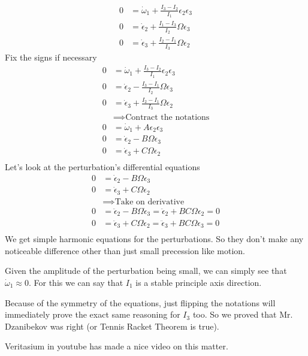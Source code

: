 \documentclass[letter, 10pts]{article}
\begin{document}
\begin{align*}
0 &= \dot{\omega}_1 + \frac{I_3 - I_2}{I_1} \epsilon_2 \epsilon_3 \\
0 &= \dot \epsilon_2 + \frac{I_1 - I_3}{I_2} \Omega \epsilon_3 \\
0 &=  \dot \epsilon_3 + \frac{I_2 - I_1}{I_3} \Omega \epsilon_2
\end{align*}
Fix the signs if necessary 
\begin{align*}
0 &= \dot{\omega}_1 + \frac{I_3 - I_2}{I_1} \epsilon_2 \epsilon_3 \\
0 &= \dot \epsilon_2 - \frac{I_3 - I_1}{I_2} \Omega \epsilon_3 \\
0 &=  \dot \epsilon_3 + \frac{I_2 - I_1}{I_3} \Omega \epsilon_2 \\
  &\implies \text{Contract the notations} \\  
0 &= \dot{\omega}_1 + A \epsilon_2 \epsilon_3 \\
0 &= \dot \epsilon_2 - B \Omega \epsilon_3 \\
0 &=  \dot \epsilon_3 + C \Omega \epsilon_2 \\
\end{align*}
Let's look at the perturbation's differential equations 
\begin{align*}
0 &= \dot \epsilon_2 - B \Omega \epsilon_3 \\
0 &=  \dot \epsilon_3 + C \Omega \epsilon_2 \\
  & \implies \text{Take on derivative}  \\ 
0 &= \ddot \epsilon_2 - B \Omega \dot \epsilon_3  = \ddot \epsilon_2 + BC \Omega \epsilon_2 = 0\\
0 &=  \ddot \epsilon_3 + C \Omega \dot \epsilon_2 = \ddot{\epsilon}_3 + BC \Omega \epsilon_3 = 0\\
\end{align*}
We get simple harmonic equations for the perturbations. So they don't make any noticeable difference other than just small precession like motion. 

Given the amplitude of the perturbation being small, we can simply see that $\dot{\omega}_1 \approx 0$. For this we can say that $I_1$ is a stable principle axis direction. 

Because of the symmetry of the equations, just flipping the notations will immediately prove the exact same reasoning for $I_3$ too. So we proved that Mr. Dzanibekov was right (or Tennis Racket Theorem is true). 


Veritasium in youtube has made a nice video on this matter. 
\end{document}

